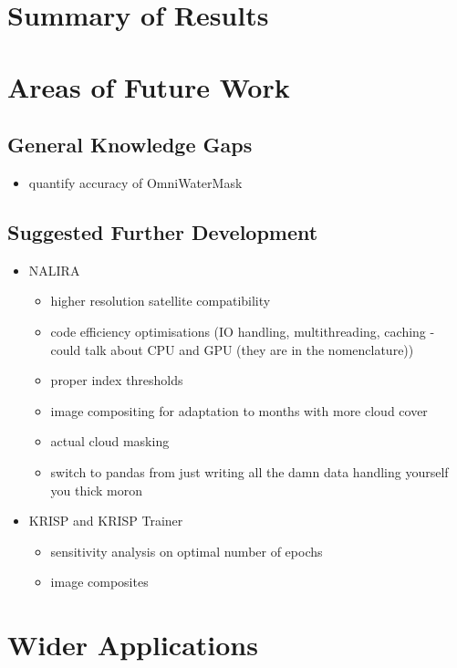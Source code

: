 

\section{Summary of Results}


\section{Areas of Future Work}
\subsection{General Knowledge Gaps}
\begin{itemize}
    \item quantify accuracy of OmniWaterMask
\end{itemize}

\subsection{Suggested Further Development}
\begin{itemize}
    \item NALIRA
    \begin{itemize}
        \item higher resolution satellite compatibility
        \item code efficiency optimisations (IO handling, multithreading, caching - could talk about CPU and GPU (they are in the nomenclature))
        \item proper index thresholds
        \item image compositing for adaptation to months with more cloud cover
        \item actual cloud masking
        \item switch to pandas from just writing all the damn data handling yourself you thick moron
    \end{itemize}
    \item KRISP and KRISP Trainer
    \begin{itemize}
        \item sensitivity analysis on optimal number of epochs
        \item image composites
    \end{itemize}
\end{itemize}

\section{Wider Applications}
